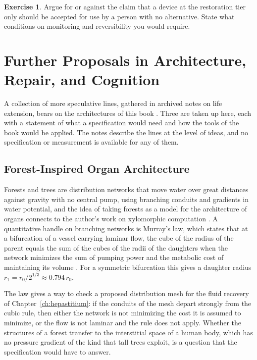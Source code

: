 \documentclass[11pt,openany]{book}
\theoremstyle{definition}
\newtheorem{exercise}{Exercise}[chapter]
\theoremstyle{remark}
\begin{document}
\begin{exercise}
Argue for or against the claim that a device at the restoration tier only should be accepted for use by a person with no alternative. State what conditions on monitoring and reversibility you would require.
\end{exercise}

\chapter{Further Proposals in Architecture, Repair, and Cognition}
\label{ch:further}

A collection of more speculative lines, gathered in archived notes on life extension, bears on the architectures of this book \cite{flyxion2026les}. Three are taken up here, each with a statement of what a specification would need and how the tools of the book would be applied. The notes describe the lines at the level of ideas, and no specification or measurement is available for any of them.

\section{Forest-Inspired Organ Architecture}

Forests and trees are distribution networks that move water over great distances against gravity with no central pump, using branching conduits and gradients in water potential, and the idea of taking forests as a model for the architecture of organs connects to the author's work on xylomorphic computation \cite{flyxion2026xylo}. A quantitative handle on branching networks is Murray's law, which states that at a bifurcation of a vessel carrying laminar flow, the cube of the radius of the parent equals the sum of the cubes of the radii of the daughters when the network minimizes the sum of pumping power and the metabolic cost of maintaining its volume \cite{murray1926}. For a symmetric bifurcation this gives a daughter radius $r_1=r_0/2^{1/3}\approx0.794\,r_0$.

The law gives a way to check a proposed distribution mesh for the fluid recovery of Chapter~\ref{ch:hepastitium}: if the conduits of the mesh depart strongly from the cubic rule, then either the network is not minimizing the cost it is assumed to minimize, or the flow is not laminar and the rule does not apply. Whether the structures of a forest transfer to the interstitial space of a human body, which has no pressure gradient of the kind that tall trees exploit, is a question that the specification would have to answer.
\end{document}
